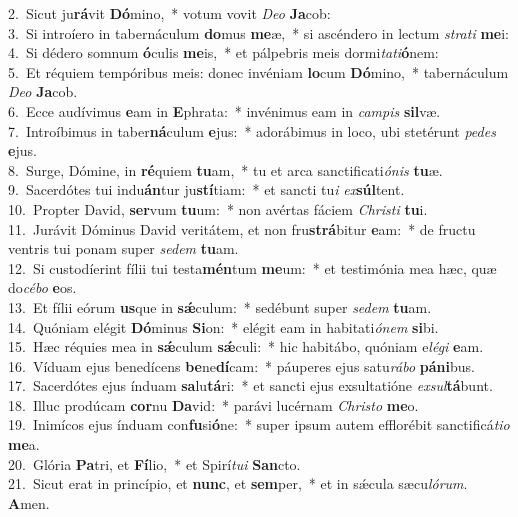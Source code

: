 {2.~}Sicut ju\textbf{rá}vit \textbf{Dó}mino,~* votum vovit \textit{De}\textit{o} \textbf{Ja}cob:\\
{3.~}Si introíero in tabernáculum \textbf{do}mus \textbf{me}æ,~* si ascéndero in lectum \textit{stra}\textit{ti} \textbf{me}i:\\
{4.~}Si dédero somnum \textbf{ó}culis \textbf{me}is,~* et pálpebris meis dormi\textit{ta}\textit{ti}\textbf{ó}nem:\\
{5.~}Et réquiem tempóribus meis: donec invéniam \textbf{lo}cum \textbf{Dó}mino,~* tabernáculum \textit{De}\textit{o} \textbf{Ja}cob.\\
{6.~}Ecce audívimus \textbf{e}am in \textbf{E}phrata:~* invénimus eam in \textit{cam}\textit{pis} \textbf{sil}væ.\\
{7.~}Introíbimus in taber\textbf{ná}culum \textbf{e}jus:~* adorábimus in loco, ubi stetérunt \textit{pe}\textit{des} \textbf{e}jus.\\
{8.~}Surge, Dómine, in \textbf{ré}quiem \textbf{tu}am,~* tu et arca sanctificati\textit{ó}\textit{nis} \textbf{tu}æ.\\
{9.~}Sacerdótes tui indu\textbf{án}tur ju\textbf{stí}tiam:~* et sancti tu\textit{i} \textit{ex}\textbf{súl}tent.\\
{10.~}Propter David, \textbf{ser}vum \textbf{tu}um:~* non avértas fáciem \textit{Chri}\textit{sti} \textbf{tu}i.\\
{11.~}Jurávit Dóminus David veritátem, et non fru\textbf{strá}bitur \textbf{e}am:~* de fructu ventris tui ponam super \textit{se}\textit{dem} \textbf{tu}am.\\
{12.~}Si custodíerint fílii tui testa\textbf{mén}tum \textbf{me}um:~* et testimónia mea hæc, quæ do\textit{cé}\textit{bo} \textbf{e}os.\\
{13.~}Et fílii eórum \textbf{us}que in \textbf{sǽ}culum:~* sedébunt super \textit{se}\textit{dem} \textbf{tu}am.\\
{14.~}Quóniam elégit \textbf{Dó}minus \textbf{Si}on:~* elégit eam in habitati\textit{ó}\textit{nem} \textbf{si}bi.\\
{15.~}Hæc réquies mea in \textbf{sǽ}culum \textbf{sǽ}culi:~* hic habitábo, quóniam e\textit{lé}\textit{gi} \textbf{e}am.\\
{16.~}Víduam ejus benedícens \textbf{be}ne\textbf{dí}cam:~* páuperes ejus satu\textit{rá}\textit{bo} \textbf{pá}\textbf{ni}bus.\\
{17.~}Sacerdótes ejus índuam \textbf{sa}lu\textbf{tá}ri:~* et sancti ejus exsultatióne \textit{ex}\textit{sul}\textbf{tá}bunt.\\
{18.~}Illuc prodúcam \textbf{cor}nu \textbf{Da}vid:~* parávi lucérnam \textit{Chri}\textit{sto} \textbf{me}o.\\
{19.~}Inimícos ejus índuam con\textbf{fu}si\textbf{ó}ne:~* super ipsum autem efflorébit sanctificá\textit{ti}\textit{o} \textbf{me}a.\\
{20.~}Glória \textbf{Pa}tri, et \textbf{Fí}lio,~* et Spirí\textit{tu}\textit{i} \textbf{San}cto.\\
{21.~}Sicut erat in princípio, et \textbf{nunc}, et \textbf{sem}per,~* et in sǽcula sæcu\textit{ló}\textit{rum}. \textbf{A}men.\\
